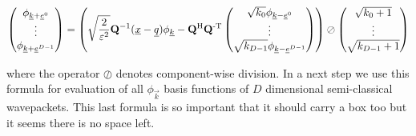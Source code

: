 \begin{equation*}
  \begin{pmatrix}
    \phi_{\underline{k}+\underline{e}^0} \\
    \vdots \\
    \phi_{\underline{k}+\underline{e}^{D-1}}
  \end{pmatrix}
  = \left(
  \sqrt{\frac{2}{\varepsilon^2}} \mathbf{Q}{}^{-1} (\underline{x}-\underline{q}) \phi_{\underline{k}}
  - \mathbf{Q}{}^{\textnormal{H}}\mathbf{Q}{}^{\textnormal{-T}}
  \begin{pmatrix}
    \sqrt{k_0} \phi_{\underline{k}-\underline{e}^0} \\
    \vdots \\
    \sqrt{k_{D-1}} \phi_{\underline{k}-\underline{e}^{D-1}}
  \end{pmatrix}
  \right)
  \oslash
  \begin{pmatrix}
    \sqrt{k_0+1}\\
    \vdots \\
    \sqrt{k_{D-1}+1}
  \end{pmatrix}
\end{equation*}

where the operator $\oslash$ denotes component-wise division. In a next step
we use this formula for evaluation of all $\phi_{\vec{k}}$ basis functions
of $D$ dimensional semi-classical wavepackets. This last formula is so important
that it should carry a box too but it seems there is no space left.


